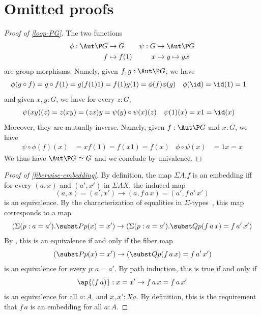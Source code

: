 \appendix
\section{Omitted proofs}
\label{omitted-proofs}
\begin{proof}[Proof of \cref{loop-PG}]
  The two functions
  \begin{align*}
    \phi:\Aut\P G&\to G
    &
    \psi:G&\to\Aut\P G
    \\
    f&\mapsto f(1)
    &
    x&\mapsto y\mapsto yx
  \end{align*}
  are group morphisms. Namely, given $f,g:\Aut\P G$, we have
  \begin{align*}
    \phi(g\circ f)&=g\circ f(1)=g(f(1)1)=f(1)g(1)=\phi(f)\phi(g)
    &
    \phi(\id)&=\id(1)=1
  \end{align*}
  and given $x,y:G$, we have for every $z:G$,
  \begin{align*}
    \psi(xy)(z)&=z(xy)=(zx)y=\psi(y)\circ\psi(x)(z)
    &
    \psi(1)(x)&=x1=\id(x)
  \end{align*}
  Moreover, they are mutually inverse. Namely, given $f:\Aut\P G$ and $x:G$, we
  have
  \begin{align*}
    \psi\circ\phi(f)(x)&=xf(1)=f(x1)=f(x)
    &
    \phi\circ\psi(x)&=1x=x    
  \end{align*}
  We thus have $\Aut\P G\simeq G$ and we conclude by univalence.
\end{proof}

\begin{proof}[Proof of \cref{fiberwise-embedding}]
  By definition, the map $\Sigma A.f$ is an embedding iff for every $(a,x)$ and
  $(a',x')$ in $\Sigma A X$, the induced map
  \[
    (a, x) = (a', x') \to (a, f\,a\,x) = (a', f\,a'\,x')
  \]
  is an equivalence. By the characterization of equalities in
  $\Sigma$-types~\cite[Theorem~2.7.2]{hottbook}, this map corresponds to a map
  \[
    (\Sigma(p : a = a').\subst Pp(x) = x') \to (\Sigma(p : a = a').\subst Qp(f\,a\,x) = f\,a'\,x')
  \]
  By \cite[Theorem~4.7.7]{hottbook}, this is an equivalence if and only if the
  fiber map
  \[
    (\subst Pp(x) = x') \to (\subst Qp(f\,a\,x) = f\,a'\,x')
  \]
  is an equivalence for every $p : a = a'$. By path induction, this is true if
  and only if
  \[
    \ap{(f\,a)} : x = x' \to f\,a\,x = f\,a\,x'
  \]
  is an equivalence for all $a : A$, and $x,x' : X a$. By definition, this is
  the requirement that $f\,a$ is an embedding for all $a : A$.
\end{proof}


